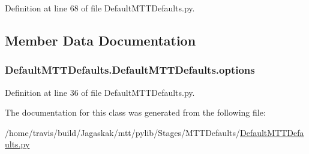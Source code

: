 Definition at line 68 of file Default\-M\-T\-T\-Defaults.\-py.



\subsection{Member Data Documentation}
\hypertarget{classDefaultMTTDefaults_1_1DefaultMTTDefaults_a733e1af4da36392ce6126d79c61aba0b}{
\subsubsection[{options}]{\setlength{\rightskip}{0pt plus 5cm}Default\-M\-T\-T\-Defaults.\-Default\-M\-T\-T\-Defaults.\-options}}\label{classDefaultMTTDefaults_1_1DefaultMTTDefaults_a733e1af4da36392ce6126d79c61aba0b}


Definition at line 36 of file Default\-M\-T\-T\-Defaults.\-py.



The documentation for this class was generated from the following file\-:\begin{DoxyCompactItemize}
\item 
/home/travis/build/\-Jagaskak/mtt/pylib/\-Stages/\-M\-T\-T\-Defaults/\hyperlink{DefaultMTTDefaults_8py}{Default\-M\-T\-T\-Defaults.\-py}\end{DoxyCompactItemize}
